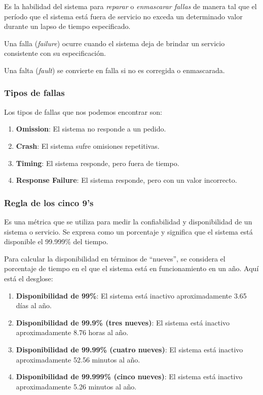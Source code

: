 \documentclass{article}
\begin{document}
			Es la habilidad del sistema para \textit{reparar} o \textit{enmascarar fallas} de manera tal que el período que el sistema está fuera de servicio no exceda un determinado valor durante un lapso de tiempo especificado.
			
			Una falla (\textit{failure}) ocurre cuando el sistema deja de brindar un servicio consistente con su especificación. 
			
			Una falta (\textit{fault}) se convierte en falla si no es corregida o enmascarada.
			
		\subsubsection{Tipos de fallas}
		
			Los tipos de fallas que nos podemos encontrar son: 
		
			\begin{enumerate}
				\item \textbf{Omission}: El sistema no responde a un pedido.
				
				\item \textbf{Crash}: El sistema sufre omisiones repetitivas.
				
				\item \textbf{Timing}: El sistema responde, pero fuera de tiempo.
				
				\item  \textbf{Response Failure}: El sistema responde, pero con un valor incorrecto.
				
			\end{enumerate}
			
		\subsubsection{Regla de los cinco 9's}\label{sec:regla_nueves}
		Es una métrica que se utiliza para medir la confiabilidad y disponibilidad de un sistema o servicio. Se expresa como un porcentaje y significa que el sistema está disponible el 99.999\% del tiempo.
		
		Para calcular la disponibilidad en términos de ``nueves'', se considera el porcentaje de tiempo en el que el sistema está en funcionamiento en un año. Aquí está el desglose:
		\begin{enumerate}
			\item \textbf{Disponibilidad de 99\%}: El sistema está inactivo aproximadamente 3.65 días al año.
			
			\item \textbf{Disponibilidad de 99.9\% (tres nueves)}: El sistema está inactivo aproximadamente 8.76 horas al año.
			
			\item \textbf{Disponibilidad de 99.99\% (cuatro nueves)}:  El sistema está inactivo aproximadamente 52.56 minutos al año.
			
			\item  \textbf{Disponibilidad de 99.999\% (cinco nueves)}: El sistema está inactivo aproximadamente 5.26 minutos al año.
			
		\end{enumerate}
		
\end{document}
